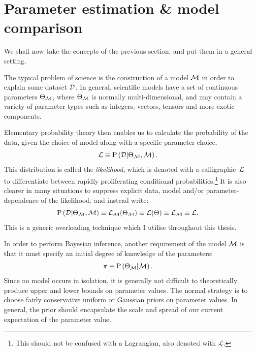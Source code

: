 \section{Parameter estimation \& model comparison}
\label{sec:bay:model_comp}
We shall now take the concepts of the previous section, and put them in a general setting. 

The typical problem of science is the construction of a model \(\mathcal{M}\) in order to explain some dataset \(\mathcal{D}\). In general, scientific models have a set of continuous parameters \(\Theta_{\mathcal{M}}\), where \(\Theta_{\mathcal{M}}\) is normally multi-dimensional, and may contain a variety of parameter types such as integers, vectors, tensors and more exotic components.

Elementary probability theory then enables us to calculate the probability of the data, given the choice of model along with a specific parameter choice.
\begin{equation}
  \mathcal{L}\equiv\mathrm{P}\left(\mathcal{D}\middle|\Theta_{\mathcal{M}},\mathcal{M}\right).
  \label{eqn:bay:lik_def}
\end{equation}
This distribution is called the {\em likelihood}, which is denoted with a calligraphic~\(\mathcal{L}\) to differentiate between rapidly proliferating conditional probabilities.\footnote{This should not be confused with a Lagrangian, also denoted with \(\mathcal{L}\).} It is also clearer in many situations to suppress explicit data, model and/or parameter-dependence of the likelihood, and instead write:
\begin{equation}
  \mathrm{P}\left(\mathcal{D}\middle|\Theta_{\mathcal{M}},\mathcal{M}\right)
  \equiv
  \mathcal{L}_{\mathcal{M}}(\Theta_{\mathcal{M}})
  \equiv
  \mathcal{L}(\Theta)
  \equiv
  \mathcal{L}_{\mathcal{M}}
  \equiv
  \mathcal{L}.
\end{equation}
This is a generic overloading technique which I utilise throughout this thesis.

In order to perform Bayesian inference, another requirement of the model \(\mathcal{M}\) is that it must specify an initial degree of knowledge of the parameters:
\begin{equation}
  \pi\equiv\mathrm{P}\left(\Theta_{\mathcal{M}}\middle|\mathcal{M}\right).
  \label{eqn:bay:prior_def}
\end{equation}
Since no model occurs in isolation, it is generally not difficult to theoretically produce upper and lower bounds on parameter values. The normal strategy is to choose fairly conservative uniform or Gaussian priors on parameter values. In general, the prior should encapsulate the scale and spread of our current expectation of the parameter value.

